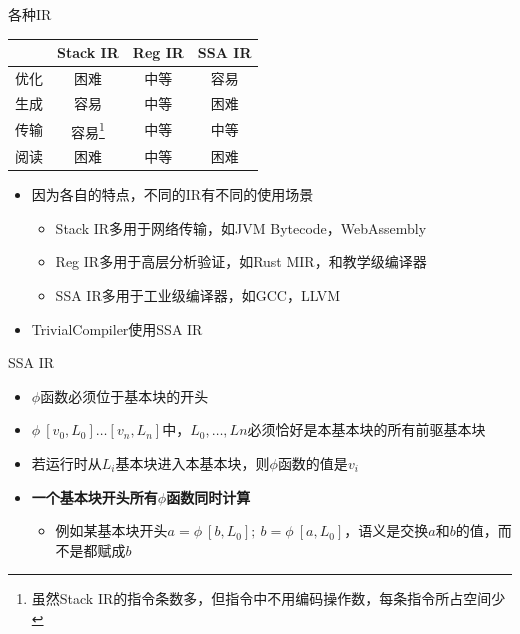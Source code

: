 \documentclass{beamer}
\begin{document}
\begin{frame}{各种IR}
\begin{table}[]
  \centering
  \begin{tabular}{|c|c|c|c|}
    \hline
    & Stack IR & Reg IR & SSA IR \\ \hline
    优化 & \textcolor[rgb]{1,0,0}{困难}       & 中等     & \textcolor[rgb]{0,1,0.2}{容易}     \\ \hline
    生成 & \textcolor[rgb]{0,1,0.2}{容易}       & 中等     & \textcolor[rgb]{1,0,0}{困难}     \\ \hline
    传输 & \textcolor[rgb]{0,1,0.2}{容易}\footnote[1]{虽然Stack IR的指令条数多，但指令中不用编码操作数，每条指令所占空间少}       & 中等     & 中等     \\ \hline
    阅读 & \textcolor[rgb]{1,0,0}{困难}       & 中等     & \textcolor[rgb]{1,0,0}{困难}     \\ \hline
  \end{tabular}
\end{table}
\begin{itemize}
  \item 因为各自的特点，不同的IR有不同的使用场景
  \begin{itemize}
    \item Stack IR多用于网络传输，如JVM Bytecode，WebAssembly
    \item Reg IR多用于高层分析验证，如Rust MIR，和教学级编译器
    \item SSA IR多用于工业级编译器，如GCC，LLVM
  \end{itemize}
  \item TrivialCompiler使用SSA IR
\end{itemize}
\end{frame}

\begin{frame}{SSA IR}
\begin{itemize}
  \item $\phi$函数必须位于基本块的开头
  \item $\phi\ [v_0, L_0] \ldots [v_n, L_n]$中，$L_0, \ldots, Ln$必须恰好是本基本块的所有前驱基本块
  \item 若运行时从$L_i$基本块进入本基本块，则$\phi$函数的值是$v_i$
  \pause
  \item {\bf 一个基本块开头所有$\phi$函数同时计算}
  \begin{itemize}
    \item 例如某基本块开头$a = \phi\ [b, L_0];\ b = \phi\ [a, L_0]$，语义是交换$a$和$b$的值，而不是都赋成$b$
  \end{itemize}
\end{itemize}
\end{frame}
\end{document}
